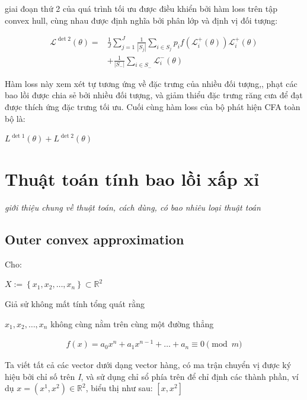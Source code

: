 \documentclass[12pt,a4paper,openany,oneside]{report}
\begin{document}
giai đoạn thứ 2 của quá trình tối ưu được điều khiển bởi hàm loss trên tập convex hull, cùng nhau được định nghĩa bởi phân lớp và định vị đối tượng:
\begin{center}
	$$
	\begin{aligned}
		\mathcal{L}^{\operatorname{det} 2}(\theta)= & \frac{1}{J} \sum_{j=1}^J \frac{1}{\left|S_j\right|} \sum_{i \in S_j} p_i f\left(\mathcal{L}_i^{+}(\theta)\right) \mathcal{L}_i^{+}(\theta) \\
		& +\frac{1}{\left|S_{-}\right|} \sum_{i \in S_{-}} \mathcal{L}_i^{-}(\theta)
	\end{aligned}
	$$
	

\end{center}

Hàm loss này xem xét tự tương ứng về đặc trưng của nhiều đối tượng,, phạt các bao lồi được chia sẻ bởi nhiều đối tượng, và giảm thiểu đặc trưng răng cưa để đạt được thích ứng đặc trưng tối ưu. Cuối cùng hàm loss của bộ phát hiện CFA toàn bộ là: 
\begin{center}
	$L^{\operatorname{det} 1}(\theta)+L^{\operatorname{det} 2}(\theta)$
\end{center}

\chapter{Thuật toán tính bao lồi xấp xỉ}
\textit{giới thiệu chung về thuật toán, cách dùng, có bao nhiêu loại thuật toán}
\section{Outer convex approximation}
Cho:
\begin{center}
	$X:=\left\{x_1, x_2, \ldots, x_n\right\} \subset \mathbb{R}^2$
\end{center}
Giả sử không mất tính tổng quát rằng
\begin{center}
	$x_1, x_2, \ldots, x_n$ không cùng nằm trên cùng một đường thẳng
\end{center}
\begin{align} \label{ptdd}
	f(x)= a_0x^n + a_1x^{n-1} + \ldots + a_n \equiv 0\pmod{m}
\end{align}

Ta viết tất cả các vector dưới dạng vector hàng, có ma trận chuyển vị  được ký hiệu bởi chỉ số trên \textit{I}, và sử dụng chỉ sổ phía trên để chỉ định các thành phần, ví dụ $x=\left(x^1, x^2\right) \in \mathbb{R}^2$, biểu thị như sau:
$\left[x, x^2 \right]$
\end{document}
